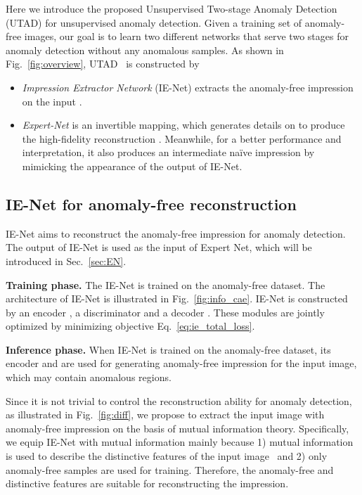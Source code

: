 \documentclass[final]{cvpr}
\newcommand{\proposed}{UTAD}
\begin{document}
Here we introduce the proposed Unsupervised Two-stage Anomaly Detection (\proposed) for unsupervised anomaly detection. Given a training set  of anomaly-free images, our goal is to learn two different networks that serve two stages for anomaly detection without any anomalous samples.
As shown in Fig.~\ref{fig:overview}, \proposed~ is constructed by 
\begin{itemize}
    \item \textit{Impression Extractor Network} (IE-Net) extracts the anomaly-free impression  on the input .
    \item \textit{Expert-Net} is an invertible mapping, which generates details on  to produce the high-fidelity reconstruction . Meanwhile, for a better performance and interpretation, it also produces an intermediate na\"ive impression  by mimicking the appearance of the output of IE-Net.
\end{itemize}

\subsection{IE-Net for anomaly-free reconstruction} \label{sec:IE}

IE-Net aims to reconstruct the anomaly-free impression  for anomaly detection. 
The output of IE-Net is used as the input of Expert Net, which will be introduced in Sec.~\ref{sec:EN}.

\noindent\textbf{Training phase.}
The IE-Net is trained on the anomaly-free dataset. The architecture of IE-Net is illustrated in Fig.~\ref{fig:info_cae}. IE-Net is constructed by an encoder , a discriminator  and a decoder . These modules are jointly optimized by minimizing objective Eq.~\eqref{eq:ie_total_loss}.

\noindent\textbf{Inference phase.}
When IE-Net is trained on the anomaly-free dataset, its encoder  and  are used for generating anomaly-free impression  for the input image, which may contain anomalous regions. 

Since it is not trivial to control the reconstruction ability for anomaly detection, as illustrated in Fig.~\ref{fig:diff}, we propose to extract the input image with anomaly-free {impression}  on the basis of mutual information theory. 
Specifically, we equip IE-Net with mutual information mainly because 
1) mutual information is used to describe the distinctive features of the input image~\cite{R:tschannen2020mutual_InfoNCE} 
and 2) only anomaly-free samples are used for training. 
Therefore, the anomaly-free and distinctive features are suitable for reconstructing the impression.
\end{document}
